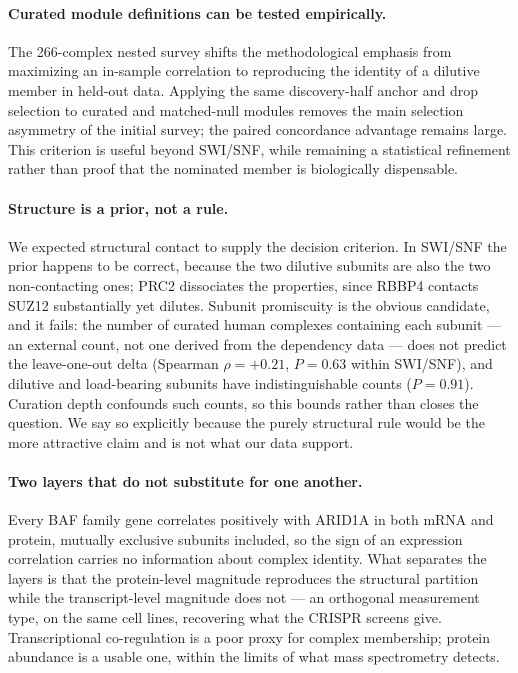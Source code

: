 \documentclass[11pt,a4paper]{article}
\begin{document}
\paragraph{Curated module definitions can be tested empirically.} The
266-complex nested survey shifts the methodological emphasis from maximizing an
in-sample correlation to reproducing the identity of a dilutive member in
held-out data. Applying the same discovery-half anchor and drop selection to
curated and matched-null modules removes the main selection asymmetry of the
initial survey; the paired concordance advantage remains large. This criterion
is useful beyond SWI/SNF, while remaining a statistical refinement rather than
proof that the nominated member is biologically dispensable.

\paragraph{Structure is a prior, not a rule.} We expected structural contact to
supply the decision criterion. In SWI/SNF the prior happens to be correct,
because the two dilutive subunits are also the two non-contacting ones; PRC2
dissociates the properties, since RBBP4 contacts SUZ12 substantially yet dilutes.
Subunit promiscuity is the obvious candidate, and it fails: the number of curated
human complexes containing each subunit \citep{meldal2022} --- an external count,
not one derived from the dependency data --- does not predict the leave-one-out
delta (Spearman $\rho = +0.21$, $P = 0.63$ within SWI/SNF), and dilutive and
load-bearing subunits have indistinguishable counts ($P = 0.91$). Curation depth
confounds such counts, so this bounds rather than closes the question. We say so
explicitly because the purely structural rule would be the more attractive claim
and is not what our data support.

\paragraph{Two layers that do not substitute for one another.} Every BAF family
gene correlates positively with ARID1A in both mRNA and protein, mutually
exclusive subunits included, so the sign of an expression correlation carries no
information about complex identity. What separates the layers is that the
protein-level magnitude reproduces the structural partition while the
transcript-level magnitude does not --- an orthogonal measurement type, on the
same cell lines, recovering what the CRISPR screens give. Transcriptional
co-regulation is a poor proxy for complex membership; protein abundance is a
usable one, within the limits of what mass spectrometry detects.
\end{document}
